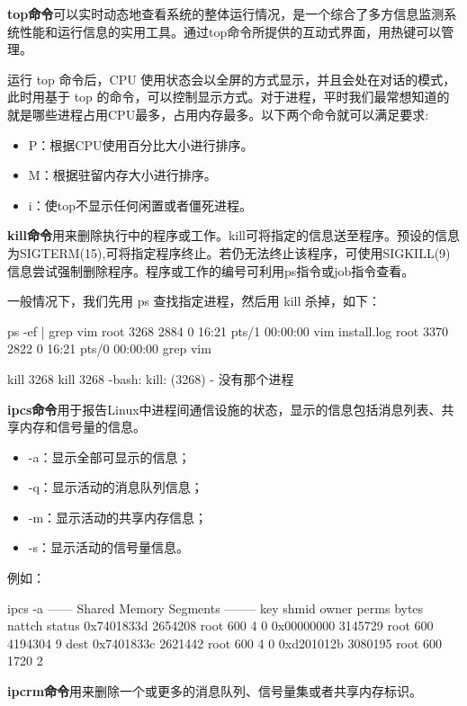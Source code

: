 \textbf{top命令}可以实时动态地查看系统的整体运行情况，是一个综合了多方信息监测系统性能和运行信息的实用工具。通过top命令所提供的互动式界面，用热键可以管理。

运行 top 命令后，CPU 使用状态会以全屏的方式显示，并且会处在对话的模式，此时用基于 top 的命令，可以控制显示方式。对于进程，平时我们最常想知道的就是哪些进程占用CPU最多，占用内存最多。以下两个命令就可以满足要求:
\begin{itemize}
\item P：根据CPU使用百分比大小进行排序。
\item M：根据驻留内存大小进行排序。
\item i：使top不显示任何闲置或者僵死进程。
\end{itemize}

\textbf{kill命令}用来删除执行中的程序或工作。kill可将指定的信息送至程序。预设的信息为SIGTERM(15),可将指定程序终止。若仍无法终止该程序，可使用SIGKILL(9)信息尝试强制删除程序。程序或工作的编号可利用ps指令或job指令查看。 

一般情况下，我们先用 ps 查找指定进程，然后用 kill 杀掉，如下：

\begin{Code}
ps -ef | grep vim 
root 3268 2884 0 16:21 pts/1 00:00:00 vim install.log 
root 3370 2822 0 16:21 pts/0 00:00:00 grep vim 

kill 3268 
kill 3268
-bash: kill: (3268) - 没有那个进程 
\end{Code}

\textbf{ipcs命令}用于报告Linux中进程间通信设施的状态，显示的信息包括消息列表、共享内存和信号量的信息。 
\begin{itemize}
\item -a：显示全部可显示的信息；
\item -q：显示活动的消息队列信息； 
\item -m：显示活动的共享内存信息； 
\item -s：显示活动的信号量信息。
\end{itemize}

例如：
\begin{Code}
ipcs -a 
------ Shared Memory Segments -------- 
key        shmid   owner perms bytes   nattch status 
0x7401833d 2654208 root  600   4 0 
0x00000000 3145729 root  600   4194304 9      dest 
0x7401833c 2621442 root  600   4       0 
0xd201012b 3080195 root  600   1720    2 
\end{Code}

\textbf{ipcrm命令}用来删除一个或更多的消息队列、信号量集或者共享内存标识。

